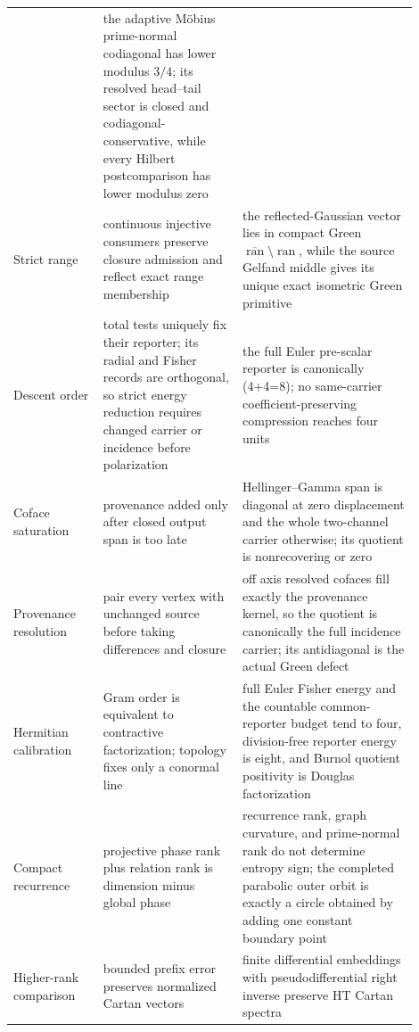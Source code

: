 \documentclass[11pt]{article}
\theoremstyle{definition}
\theoremstyle{remark}
\begin{document}
\begin{longtable}{@{}>{\raggedright\arraybackslash}p{0.20\linewidth}
                >{\raggedright\arraybackslash}p{0.31\linewidth}
                >{\raggedright\arraybackslash}p{0.39\linewidth}@{}}
 & the adaptive M\"obius prime-normal codiagonal has lower modulus \(3/4\); its resolved head--tail sector is closed and codiagonal-conservative, while every Hilbert postcomparison has lower modulus zero\\\addlinespace[2pt]
Strict range
 & continuous injective consumers preserve closure admission and reflect exact range membership
 & the reflected-Gaussian vector lies in compact Green \(\overline{\operatorname{ran}}\setminus\operatorname{ran}\), while the source Gelfand middle gives its unique exact isometric Green primitive\\\addlinespace[2pt]
Descent order
 & total tests uniquely fix their reporter; its radial and Fisher records are orthogonal, so strict energy reduction requires changed carrier or incidence before polarization
 & the full Euler pre-scalar reporter is canonically (4+4=8); no same-carrier coefficient-preserving compression reaches four units\\\addlinespace[2pt]
Coface saturation
 & provenance added only after closed output span is too late
 & Hellinger--Gamma span is diagonal at zero displacement and the whole two-channel carrier otherwise; its quotient is nonrecovering or zero\\\addlinespace[2pt]
Provenance resolution
 & pair every vertex with unchanged source before taking differences and closure
 & off axis resolved cofaces fill exactly the provenance kernel, so the quotient is canonically the full incidence carrier; its antidiagonal is the actual Green defect\\\addlinespace[2pt]
Hermitian calibration
 & Gram order is equivalent to contractive factorization; topology fixes only a conormal line
 & full Euler Fisher energy and the countable common-reporter budget tend to four, division-free reporter energy is eight, and Burnol quotient positivity is Douglas factorization\\\addlinespace[2pt]
Compact recurrence
 & projective phase rank plus relation rank is dimension minus global phase
 & recurrence rank, graph curvature, and prime-normal rank do not determine entropy sign; the completed parabolic outer orbit is exactly a circle obtained by adding one constant boundary point\\\addlinespace[2pt]
Higher-rank comparison
 & bounded prefix error preserves normalized Cartan vectors
 & finite differential embeddings with pseudodifferential right inverse preserve HT Cartan spectra\\
\bottomrule
\end{longtable}
\endgroup
\end{document}

